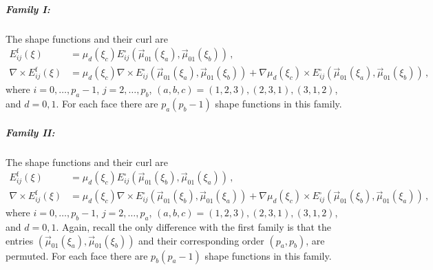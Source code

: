 \subparagraph{Family I:}
The shape functions and their curl are
\begin{equation}
	\begin{aligned}
		E_{ij}^\mathrm{f}(\xi)&=\mu_d(\xi_c)E_{ij}^\square(\vec{\mu}_{01}(\xi_a),\vec{\mu}_{01}(\xi_b))\,,\\
		\nabla\times E_{ij}^\mathrm{f}(\xi)&=\mu_d(\xi_c)\nabla\times E_{ij}^\square(\vec{\mu}_{01}(\xi_a),\vec{\mu}_{01}(\xi_b))
			+\nabla\mu_d(\xi_c)\times E_{ij}^\square(\vec{\mu}_{01}(\xi_a),\vec{\mu}_{01}(\xi_b))\,,
	\end{aligned}
\end{equation}
where $i=0,\ldots,p_a-1$, $j=2,\ldots,p_b$, $(a,b,c)=(1,2,3),(2,3,1),(3,1,2)$, and $d=0,1$.
For each face there are $p_a(p_b-1)$ shape functions in this family.

\subparagraph{Family II:}
The shape functions and their curl are
\begin{equation}
	\begin{aligned}
		E_{ij}^\mathrm{f}(\xi)&=\mu_d(\xi_c)E_{ij}^\square(\vec{\mu}_{01}(\xi_b),\vec{\mu}_{01}(\xi_a))\,,\\
		\nabla\times E_{ij}^\mathrm{f}(\xi)&=\mu_d(\xi_c)\nabla\times E_{ij}^\square(\vec{\mu}_{01}(\xi_b),\vec{\mu}_{01}(\xi_a))
			+\nabla\mu_d(\xi_c)\times E_{ij}^\square(\vec{\mu}_{01}(\xi_b),\vec{\mu}_{01}(\xi_a))\,,
	\end{aligned}
\end{equation}
where $i=0,\ldots,p_b-1$, $j=2,\ldots,p_a$, $(a,b,c)=(1,2,3),(2,3,1),(3,1,2)$, and $d=0,1$.
Again, recall the only difference with the first family is that the entries $(\vec{\mu}_{01}(\xi_a),\vec{\mu}_{01}(\xi_b))$ and their corresponding order $(p_a,p_b)$, are permuted.
For each face there are $p_b(p_a-1)$ shape functions in this family.

